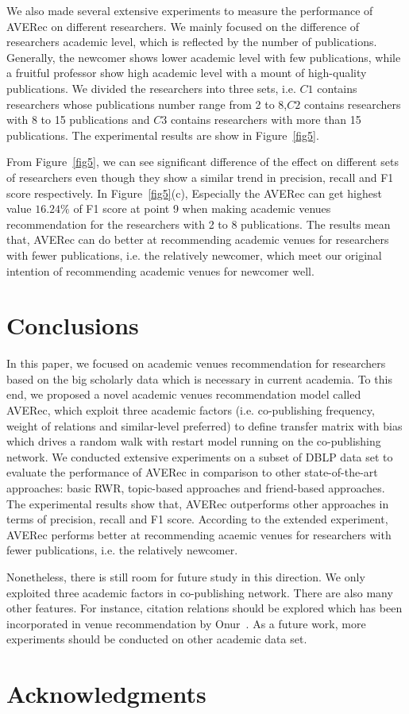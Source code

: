 \documentclass[9pt]{acm_proc_article-sp}
\begin{document}
We also made several extensive experiments to measure the performance of AVERec on different researchers. We mainly focused on the difference of researchers academic level, which is reflected by the number of publications. Generally, the newcomer shows lower academic level with few publications, while a fruitful professor show high academic level with a mount of high-quality publications. We divided the researchers into three sets, i.e. $C1$ contains researchers whose publications number range from 2 to 8,$C2$ contains researchers with 8 to 15 publications and $C3$ contains researchers with more than 15 publications. The experimental results are show in Figure~\ref{fig5}.


From Figure~\ref{fig5}, we can see significant difference of the effect on different sets of researchers even though they show a similar trend in precision, recall and F1 score respectively. In Figure~\ref{fig5}(c), Especially the AVERec can get highest value $16.24\%$ of F1 score at point 9 when making academic venues recommendation for the researchers with 2 to 8 publications. The results mean that, AVERec can do better at recommending academic venues for researchers with fewer publications, i.e. the relatively newcomer, which meet our original intention of recommending academic venues for newcomer well.

\section{Conclusions}
In this paper, we focused on academic venues recommendation for researchers based on the big scholarly data which is necessary in current academia. To this end, we proposed a novel academic venues recommendation model called AVERec, which exploit three academic factors (i.e. co-publishing frequency, weight of relations and similar-level preferred) to define transfer matrix with bias which drives a random walk with restart model running on the co-publishing network. We conducted extensive experiments on a subset of DBLP data set to evaluate the performance of AVERec in comparison to other state-of-the-art approaches: basic RWR, topic-based approaches and friend-based approaches. The experimental results show that, AVERec outperforms other approaches in terms of precision, recall and F1 score. According to the extended experiment, AVERec performs better at recommending acaemic venues for researchers with fewer publications, i.e. the relatively newcomer.

Nonetheless, there is still room for future study in this direction. We only exploited three academic factors in co-publishing network. There are also many other features. For instance, citation relations should be explored which has been incorporated in venue recommendation by Onur~\cite{kuccuktuncc2012recommendation}. As a future work, more experiments should be conducted on other academic data set.

\section{Acknowledgments}



\balancecolumns
\end{document}

